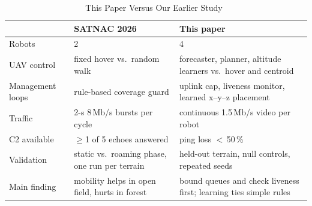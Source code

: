 \begin{table}[t]
\caption{This Paper Versus Our Earlier Study~\cite{makhubela2026satnac}}
\label{tab:satnac}
\centering\footnotesize\setlength{\tabcolsep}{3pt}
\begin{tabular}{@{}p{}p{}p{}@{}}
\toprule
 & SATNAC 2026 & This paper \\
\midrule
Robots & 2 & 4 \\
UAV control & fixed hover vs.\ random walk & forecaster, planner, altitude learners vs.\ hover and centroid \\
Management loops & rule-based coverage guard & uplink cap, liveness monitor, learned x--y--z placement \\
Traffic & 2-s 8\,Mb/s bursts per cycle & continuous 1.5\,Mb/s video per robot \\
C2 available & $\geq$1 of 5 echoes answered & ping loss $<$\,50\,\% \\
Validation & static vs.\ roaming phase, one run per terrain & held-out terrain, null controls, repeated seeds \\
Main finding & mobility helps in open field, hurts in forest & bound queues and check liveness first; learning ties simple rules \\
\bottomrule
\end{tabular}
\end{table}
